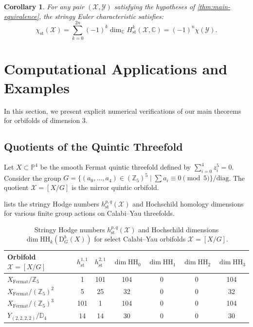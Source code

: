 \documentclass[12pt,reqno]{amsart}
\theoremstyle{plain}
\newtheorem{corollary}[theorem]{Corollary}
\theoremstyle{definition}
\theoremstyle{remark}
\newcommand{\cX}{\mathcal{X}}
\newcommand{\cY}{\mathcal{Y}}
\newcommand{\Db}{\mathrm{D}^b}
\newcommand{\HH}{\mathrm{HH}}
\newcommand{\CC}{\mathbb{C}}
\newcommand{\ZZ}{\mathbb{Z}}
\newcommand{\PP}{\mathbb{P}}
\numberwithin{equation}{section}
\begin{document}
\begin{corollary}
\label{cor:betti-equality}
For any pair $(\cX, \cY)$ satisfying the hypotheses of \cref{thm:main-equivalence}, the stringy Euler characteristic satisfies:
\begin{equation}
\chi_{\mathrm{st}}(\cX) = \sum_{k=0}^{2n} (-1)^k \dim_{\CC} H^k_{\mathrm{st}}(\cX, \CC) = (-1)^n \chi(\cY).
\end{equation}
\end{corollary}

\section{Computational Applications and Examples}
\label{sec:examples}

In this section, we present explicit numerical verifications of our main theorems for orbifolds of dimension 3.

\subsection{Quotients of the Quintic Threefold}
Let $X \subset \PP^4$ be the smooth Fermat quintic threefold defined by $\sum_{i=0}^4 z_i^5 = 0$. Consider the group $G = \{ (a_0, \dots, a_4) \in (\ZZ_5)^5 \mid \sum a_i \equiv 0 \pmod 5 \} / \text{diag}$. The quotient $\cX = [X/G]$ is the mirror quintic orbifold.

 lists the stringy Hodge numbers $h^{p,q}_{\mathrm{st}}(\cX)$ and Hochschild homology dimensions for various finite group actions on Calabi--Yau threefolds.

\begin{table}[htbp]
\centering
\caption{Stringy Hodge numbers $h^{p,q}_{\mathrm{st}}(\cX)$ and Hochschild dimensions $\dim \HH_k(\Db_G(X))$ for select Calabi--Yau orbifolds $\cX = [X/G]$.}
\label{tab:hodge-numbers}
\vspace{0.5em}
\small
\begin{tabular}{lcccccc}
\toprule
Orbifold $\cX = [X/G]$ & $h^{1,1}_{\mathrm{st}}$ & $h^{2,1}_{\mathrm{st}}$ & $\dim \HH_0$ & $\dim \HH_1$ & $\dim \HH_2$ & $\dim \HH_3$ \\
\midrule
$X_{\text{Fermat}} / \ZZ_5$ & 1 & 101 & 104 & 0 & 0 & 104 \\{}
$X_{\text{Fermat}} / (\ZZ_5)^2$ & 5 & 25 & 32 & 0 & 0 & 32 \\{}
$X_{\text{Fermat}} / (\ZZ_5)^3$ & 101 & 1 & 104 & 0 & 0 & 104 \\{}
$Y_{(2,2,2,2)} / \mathbb{D}_4$ & 14 & 14 & 30 & 0 & 0 & 30 \\
\bottomrule
\end{tabular}
\end{table}
\end{document}
